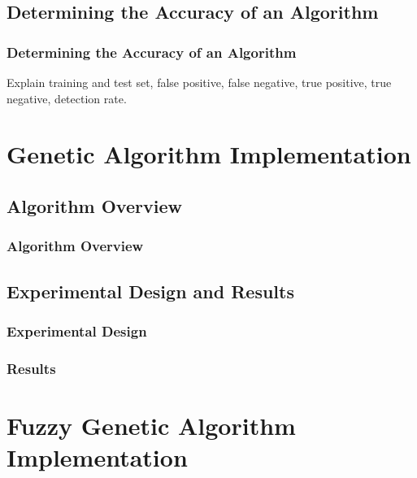 \documentclass{beamer}
\begin{document}
\subsection{Determining the Accuracy of an Algorithm}
\begin{frame}
  \frametitle{Determining the Accuracy of an Algorithm}
Explain training and test set, false positive, false negative, true positive, true negative, detection rate.
\end{frame}
\section[Genetic Algorithm Implementation]{Genetic Algorithm Implementation}
\subsection{Algorithm Overview}
\begin{frame}
  \frametitle{Algorithm Overview}

\end{frame}


\subsection{Experimental Design and Results}
\begin{frame}
  \frametitle{Experimental Design}

\end{frame}


\begin{frame}
  \frametitle{Results}

\end{frame}
\section[Fuzzy Genetic Algorithm Implementation]{Fuzzy Genetic Algorithm Implementation}
\end{document}
